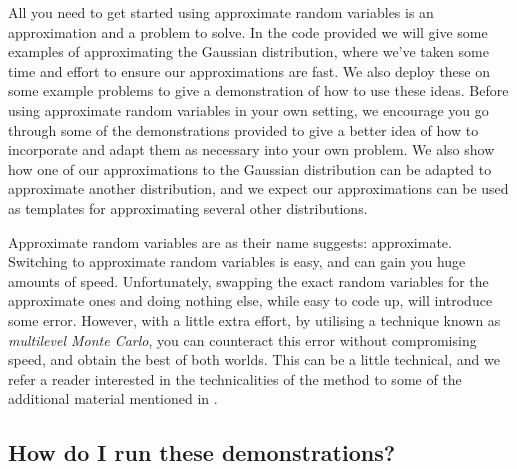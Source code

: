 \documentclass[11pt,a4paper,twoside,english]{extarticle}
\begin{document}
All you need to get started using approximate random variables is an approximation and a problem to solve. In the code provided we will give some examples of approximating the Gaussian distribution, where we've taken some time and effort to ensure our approximations are fast. We also deploy these on some example problems to give a demonstration of how to use these ideas. Before using approximate random variables in your own setting, we encourage you go through some of the demonstrations provided to give a better idea of how to incorporate and adapt them as necessary into your own problem. We also show how one of our approximations to the Gaussian distribution can be adapted to approximate another distribution, and we expect our approximations can be used as templates for approximating several other distributions. 

Approximate random variables are as their name suggests: approximate. Switching to approximate random variables is easy, and can gain you huge amounts of speed. Unfortunately, swapping the exact random variables for the approximate ones and doing nothing else, while easy to code up, will introduce some error. However, with a little extra effort, by utilising a technique known as \emph{multilevel Monte Carlo}, you can counteract this error without compromising speed, and obtain the best of both worlds. This can be a little technical, and we refer a reader interested in the technicalities of the method to some of the additional material mentioned in .


\subsection{How do I run these demonstrations?}
\end{document}
